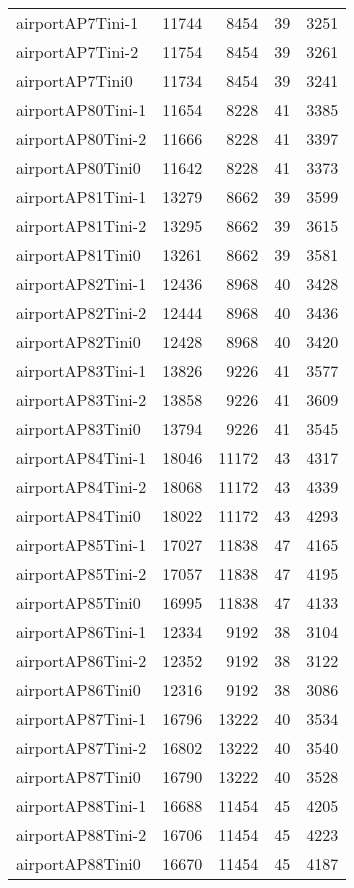 \begin{tabular}{lrrrr}
airportAP7Tini-1 & 11744 & 8454 & 39 & 3251 \\
airportAP7Tini-2 & 11754 & 8454 & 39 & 3261 \\
airportAP7Tini0 & 11734 & 8454 & 39 & 3241 \\
airportAP80Tini-1 & 11654 & 8228 & 41 & 3385 \\
airportAP80Tini-2 & 11666 & 8228 & 41 & 3397 \\
airportAP80Tini0 & 11642 & 8228 & 41 & 3373 \\
airportAP81Tini-1 & 13279 & 8662 & 39 & 3599 \\
airportAP81Tini-2 & 13295 & 8662 & 39 & 3615 \\
airportAP81Tini0 & 13261 & 8662 & 39 & 3581 \\
airportAP82Tini-1 & 12436 & 8968 & 40 & 3428 \\
airportAP82Tini-2 & 12444 & 8968 & 40 & 3436 \\
airportAP82Tini0 & 12428 & 8968 & 40 & 3420 \\
airportAP83Tini-1 & 13826 & 9226 & 41 & 3577 \\
airportAP83Tini-2 & 13858 & 9226 & 41 & 3609 \\
airportAP83Tini0 & 13794 & 9226 & 41 & 3545 \\
airportAP84Tini-1 & 18046 & 11172 & 43 & 4317 \\
airportAP84Tini-2 & 18068 & 11172 & 43 & 4339 \\
airportAP84Tini0 & 18022 & 11172 & 43 & 4293 \\
airportAP85Tini-1 & 17027 & 11838 & 47 & 4165 \\
airportAP85Tini-2 & 17057 & 11838 & 47 & 4195 \\
airportAP85Tini0 & 16995 & 11838 & 47 & 4133 \\
airportAP86Tini-1 & 12334 & 9192 & 38 & 3104 \\
airportAP86Tini-2 & 12352 & 9192 & 38 & 3122 \\
airportAP86Tini0 & 12316 & 9192 & 38 & 3086 \\
airportAP87Tini-1 & 16796 & 13222 & 40 & 3534 \\
airportAP87Tini-2 & 16802 & 13222 & 40 & 3540 \\
airportAP87Tini0 & 16790 & 13222 & 40 & 3528 \\
airportAP88Tini-1 & 16688 & 11454 & 45 & 4205 \\
airportAP88Tini-2 & 16706 & 11454 & 45 & 4223 \\
airportAP88Tini0 & 16670 & 11454 & 45 & 4187 \\

\end{tabular}
